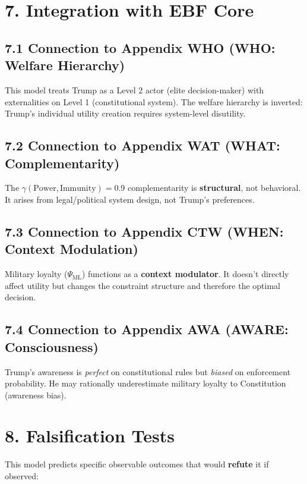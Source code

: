 \section{7. Integration with EBF Core}

\subsection{7.1 Connection to Appendix WHO (WHO: Welfare Hierarchy)}

This model treats Trump as a Level 2 actor (elite decision-maker) with externalities on Level 1 (constitutional system). The welfare hierarchy is inverted: Trump's individual utility creation requires system-level disutility.

\subsection{7.2 Connection to Appendix WAT (WHAT: Complementarity)}

The $\gamma(\text{Power}, \text{Immunity}) = 0.9$ complementarity is \textbf{structural}, not behavioral. It arises from legal/political system design, not Trump's preferences.

\subsection{7.3 Connection to Appendix CTW (WHEN: Context Modulation)}

Military loyalty ($\Psi_{\text{ML}}$) functions as a \textbf{context modulator}. It doesn't directly affect utility but changes the constraint structure and therefore the optimal decision.

\subsection{7.4 Connection to Appendix AWA (AWARE: Consciousness)}

Trump's awareness is \textit{perfect} on constitutional rules but \textit{biased} on enforcement probability. He may rationally underestimate military loyalty to Constitution (awareness bias).

\section{8. Falsification Tests}

This model predicts specific observable outcomes that would \textbf{refute} it if observed:

